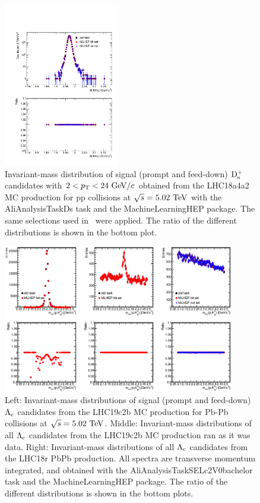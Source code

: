 \begin{figure}[b!]
\begin{center}
\includegraphics[width=0.45\textwidth]{figures/DsInvMassComparison.pdf}
\caption{Invariant-mass distribution of signal (prompt and feed-down) $\rm D_s^+$ candidates with $2<p_{\rm T}<24~\mathrm{GeV}/c$ obtained from the LHC18a4a2 MC production for pp collisions at $\sqrt{s}=5.02~\mathrm{TeV}$ with the AliAnalysisTaskDs task and the MachineLearningHEP package. The same selections used in~\cite{Acharya:2019mgn} were applied. The ratio of the different distributions is shown in the bottom plot.}
\label{fig:InvMassDsComparisonMCpp}
\end{center}
\end{figure}

\begin{figure}[tb!]
\begin{center}
\includegraphics[width=0.9\textwidth]{figures/LcInvMassComparison.eps}
\caption{Left: Invariant-mass distributions of signal (prompt and feed-down) $\mbox{$\mathrm {\Lambda_{c}}$}$ candidates from the LHC19c2b MC production for Pb-Pb collisions at $\sqrt{s}=5.02~\mathrm{TeV}$. Middle: Invariant-mass distributions of all $\mbox{$\mathrm {\Lambda_{c}}$}$ candidates from the LHC19c2b MC production ran as it was data. Right: Invariant-mass distributions of all $\mbox{$\mathrm {\Lambda_{c}}$}$ candidates from the LHC18r PbPb production. All spectra are transverse momentum integrated, and obtained with the AliAnalysisTaskSELc2V0bachelor task and the MachineLearningHEP package. The ratio of the different distributions is shown in the bottom plots.}
\label{fig:InvMassLcComparisonMCDataPbPb}
\end{center}
\end{figure}

